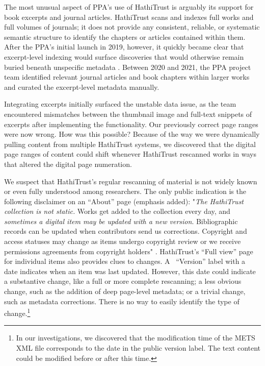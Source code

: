 \documentclass{anthology-ch}         %
\begin{document}
The most unusual aspect of PPA’s use of HathiTrust is arguably its support for book excerpts and journal articles. HathiTrust scans and indexes full works and full volumes of journals; it does not provide any consistent, reliable, or systematic semantic structure to identify the chapters or articles contained within them. After the PPA's initial launch in 2019, however, it quickly became clear that excerpt-level indexing would surface discoveries that would otherwise remain buried beneath unspecific metadata \cite{naydan_book_2024}. Between 2020 and 2021, the PPA project team identified relevant journal articles and book chapters within larger works and curated the excerpt-level metadata manually. 

Integrating excerpts initially surfaced the unstable data issue, as the team encountered mismatches between the thumbnail image and full-text snippets of excerpts after implementing the functionality. Our previously correct page ranges were now wrong. How was this possible? Because of the way we were dynamically pulling content from multiple HathiTrust systems, we discovered that the digital page ranges of content could shift whenever HathiTrust rescanned works in ways that altered the digital page numeration.

We suspect that HathiTrust’s regular rescanning of material is not widely known or even fully understood among researchers. The only public indication is the following disclaimer on an “About” page (emphasis added): "\textit{The HathiTrust collection is not static.} Works get added to the collection every day, and \textit{sometimes a digital item may be updated with a new version}. Bibliographic records can be updated when contributors send us corrections. Copyright and access statuses may change as items undergo copyright review or we receive permissions agreements from copyright holders" \cite{noauthor_how_nodate}. HathiTrust’s “Full view” page for individual items also provides clues to changes. A  “Version” label with a date indicates when an item was last updated. However, this date could indicate a substantive change, like a full or more complete rescanning; a less obvious change, such as the addition of deep page-level metadata; or a trivial change, such as metadata corrections. There is no way to easily identify the type of change.\footnote{In our investigations, we discovered that the modification time of the METS XML file corresponds to the date in the public version label. The text content could be modified before or after this time. }
\end{document}

